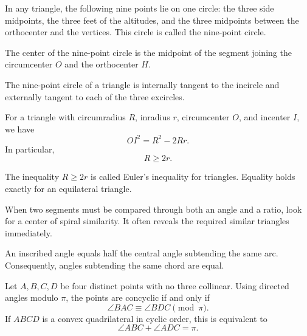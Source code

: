     \begin{theorem}
        In any triangle, the following nine points lie on one circle:
        the three side midpoints, the three feet of the altitudes, and the
        three midpoints between the orthocenter and the vertices. This circle
        is called the nine-point circle.
    \end{theorem}

    \begin{remark}
        The center of the nine-point circle is the midpoint of the segment
        joining the circumcenter $O$ and the orthocenter $H$.
    \end{remark}

    \begin{theorem}
        The nine-point circle of a triangle is internally tangent to the incircle
        and externally tangent to each of the three excircles.
    \end{theorem}

    \begin{theorem}
        For a triangle with circumradius $R$, inradius $r$, circumcenter $O$,
        and incenter $I$, we have
        \[
            OI^2=R^2-2Rr.
        \]
        In particular,
        \[
            R\geq 2r.
        \]
    \end{theorem}

    \begin{remark}
        The inequality $R\geq 2r$ is called Euler's inequality for triangles.
        Equality holds exactly for an equilateral triangle.
    \end{remark}

    \begin{strategy}
        When two segments must be compared through both an angle and a ratio,
        look for a center of spiral similarity. It often reveals the required
        similar triangles immediately.
    \end{strategy}

    \begin{theorem}
        An inscribed angle equals half the central angle subtending the same arc.
        Consequently, angles subtending the same chord are equal.
    \end{theorem}

    \begin{theorem}
        Let $A,B,C,D$ be four distinct points with no three collinear. Using
        directed angles modulo $\pi$, the points are concyclic if and only if
        \[
            \angle BAC\equiv\angle BDC\pmod\pi.
        \]
        If $ABCD$ is a convex quadrilateral in cyclic order, this is equivalent
        to
        \[
            \angle ABC+\angle ADC=\pi.
        \]
    \end{theorem}

